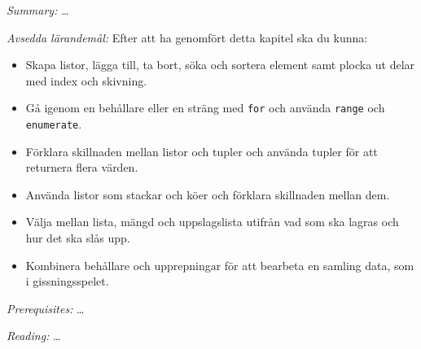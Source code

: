 
\emph{Summary:}
\dots

\emph{Avsedda lärandemål:}
Efter att ha genomfört detta kapitel ska du kunna:
\begin{itemize}
  \item Skapa listor, lägga till, ta bort, söka och sortera element samt
    plocka ut delar med index och skivning. %
  \item Gå igenom en behållare eller en sträng med \texttt{for}
    och använda \texttt{range} och
    \texttt{enumerate}. %
  \item Förklara skillnaden mellan listor och tupler och använda tupler för
    att returnera flera värden. %
  \item Använda listor som stackar och köer och förklara skillnaden mellan
    dem. %
  \item Välja mellan lista, mängd och uppslagslista utifrån vad som ska
    lagras och hur det ska slås upp. %
  \item Kombinera behållare och upprepningar för att bearbeta en samling
    data, som i gissningsspelet. %
\end{itemize}

\emph{Prerequisites:}
\dots

\emph{Reading:}
\dots
